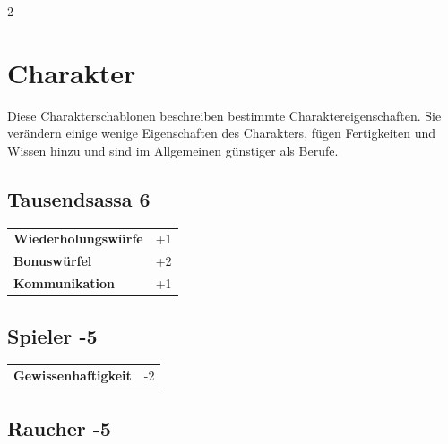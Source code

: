 \begin{multicols}{2}
\section{Charakter}

Diese Charakterschablonen beschreiben bestimmte Charaktereigenschaften. Sie verändern einige wenige Eigenschaften des Charakters, fügen Fertigkeiten und Wissen hinzu und sind im Allgemeinen günstiger als Berufe.

\begin{tcolorbox}
    \subsection*{Tausendsassa \hfill \small{6 }}
    \tcblower




\begin{tabular}{@{}ll@{}}
    \textbf{Wiederholungswürfe} & +1\\
    \textbf{Bonuswürfel} & +2\\
    \textbf{Kommunikation} & +1\\
\end{tabular}


\end{tcolorbox}

\begin{tcolorbox}
    \subsection*{Spieler \hfill \small{-5 }}
    \tcblower




\begin{tabular}{@{}ll@{}}
    \textbf{Gewissenhaftigkeit} & -2\\
\end{tabular}


\end{tcolorbox}

\begin{tcolorbox}
    \subsection*{Raucher \hfill \small{-5 }}
    \tcblower





\end{tcolorbox}
\end{multicols}
